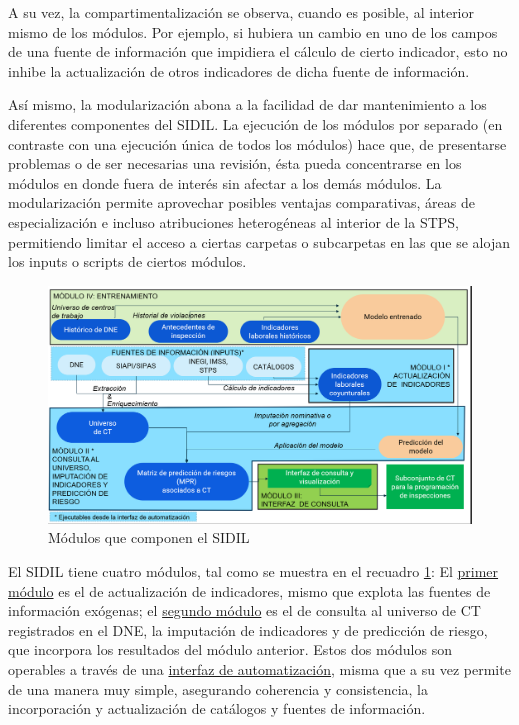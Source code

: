 \documentclass[
]{article}
\begin{document}
A su vez, la compartimentalización se observa, cuando es posible, al interior mismo de los módulos. Por ejemplo, si hubiera un cambio en uno de los campos de una fuente de información que impidiera el cálculo de cierto indicador, esto no inhibe la actualización de otros indicadores de dicha fuente de información.

Así mismo, la modularización abona a la facilidad de dar mantenimiento a los diferentes componentes del SIDIL. La ejecución de los módulos por separado (en contraste con una ejecución única de todos los módulos) hace que, de presentarse problemas o de ser necesarias una revisión, ésta pueda concentrarse en los módulos en donde fuera de interés sin afectar a los demás módulos. La modularización permite aprovechar posibles ventajas comparativas, áreas de especialización e incluso atribuciones heterogéneas al interior de la STPS, permitiendo limitar el acceso a ciertas carpetas o subcarpetas en las que se alojan los inputs o scripts de ciertos módulos.

\begin{figure}
\includegraphics[width=0.5\linewidth]{images-1/02/pipeline_elaborado} \caption{Módulos que componen el SIDIL}\label{fig:modulosSIDIL}
\end{figure}

El SIDIL tiene cuatro módulos, tal como se muestra en el recuadro \ref{fig:modulosSIDIL}: El \protect\hyperlink{moduloIexplicaciongeneral}{primer módulo} es el de actualización de indicadores, mismo que explota las fuentes de información exógenas; el \protect\hyperlink{moduloIIexplicaciongeneral}{segundo módulo} es el de consulta al universo de CT registrados en el DNE, la imputación de indicadores y de predicción de riesgo, que incorpora los resultados del módulo anterior. Estos dos módulos son operables a través de una \protect\hyperlink{moduloIyIIexplicaciongeneral}{interfaz de automatización}, misma que a su vez permite de una manera muy simple, asegurando coherencia y consistencia, la incorporación y actualización de catálogos y fuentes de información.
\end{document}
